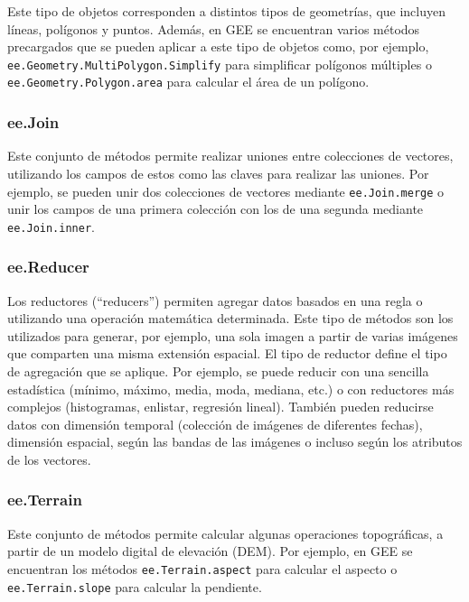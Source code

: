 \documentclass[
  12pt,
  letterpaper,
  twoside]{book}
\begin{document}
Este tipo de objetos corresponden a distintos tipos de geometrías, que incluyen líneas, polígonos y puntos. Además, en GEE se encuentran varios métodos precargados que se pueden aplicar a este tipo de objetos como, por ejemplo, \texttt{ee.Geometry.MultiPolygon.Simplify} para simplificar polígonos múltiples o \texttt{ee.Geometry.Polygon.area} para calcular el área de un polígono.

\hypertarget{ee.join}{%
\subsubsection*{ee.Join}\label{ee.join}}

Este conjunto de métodos permite realizar uniones entre colecciones de vectores, utilizando los campos de estos como las claves para realizar las uniones. Por ejemplo, se pueden unir dos colecciones de vectores mediante \texttt{ee.Join.merge} o unir los campos de una primera colección con los de una segunda mediante \texttt{ee.Join.inner}.

\hypertarget{ee.reducer}{%
\subsubsection*{ee.Reducer}\label{ee.reducer}}

Los reductores (``reducers'') permiten agregar datos basados en una regla o utilizando una operación matemática determinada. Este tipo de métodos son los utilizados para generar, por ejemplo, una sola imagen a partir de varias imágenes que comparten una misma extensión espacial. El tipo de reductor define el tipo de agregación que se aplique. Por ejemplo, se puede reducir con una sencilla estadística (mínimo, máximo, media, moda, mediana, etc.) o con reductores más complejos (histogramas, enlistar, regresión lineal). También pueden reducirse datos con dimensión temporal (colección de imágenes de diferentes fechas), dimensión espacial, según las bandas de las imágenes o incluso según los atributos de los vectores.

\hypertarget{ee.terrain}{%
\subsubsection*{ee.Terrain}\label{ee.terrain}}

Este conjunto de métodos permite calcular algunas operaciones topográficas, a partir de un modelo digital de elevación (DEM). Por ejemplo, en GEE se encuentran los métodos \texttt{ee.Terrain.aspect} para calcular el aspecto o \texttt{ee.Terrain.slope} para calcular la pendiente.
\end{document}
